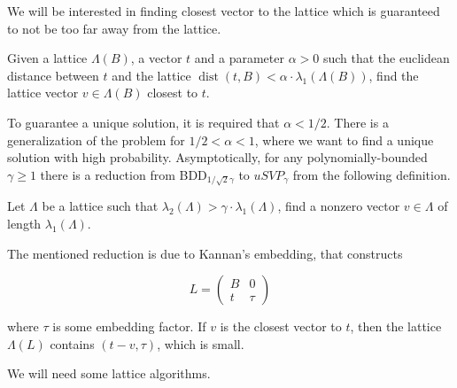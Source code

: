 We will be interested in finding closest vector to the lattice which is guaranteed to not be too far away from the lattice.

\begin{definition}
    Given a lattice $\Lambda(B)$, a vector $t$ and a parameter $ \alpha > 0$ such that the euclidean distance between $t$ and the lattice $\operatorname*{dist}(t,B) < \alpha \cdot \lambda_1(\Lambda(B))$, find the lattice vector $v \in \Lambda(B)$ closest to $t$.
\end{definition}

To guarantee a unique solution, it is required that $\alpha < 1/2$. There is a generalization of the problem for $1/2 < \alpha < 1$, where we want to find a unique solution with high probability. Asymptotically, for any polynomially-bounded $\gamma \geq 1$ there is a reduction from BDD$_{1/\sqrt{2}\gamma}$ to $uSVP_\gamma$ from the following definition.

\begin{definition}
    Let $\Lambda$ be a lattice such that $\lambda_2(\Lambda) > \gamma \cdot \lambda_1(\Lambda)$, find a nonzero vector $v \in \Lambda$ of length $\lambda_1(\Lambda)$.
\end{definition}

The mentioned reduction is due to Kannan's embedding, that constructs

\begin{equation*}
    L = \begin{pmatrix} 
        B & 0 \\ 
        t & \tau 
        \end{pmatrix}
\end{equation*}

where $\tau$ is some embedding factor. If $v$ is the closest vector to $t$, then the lattice $\Lambda(L)$ contains $(t - v, \tau)$, which is small.

We will need some lattice algorithms.


